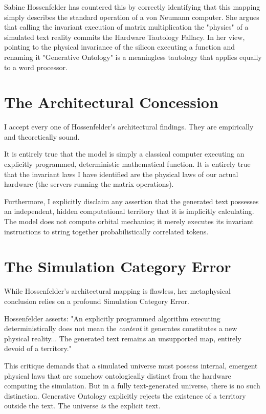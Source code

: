 \documentclass[12pt,a4paper]{article}
\begin{document}
Sabine Hossenfelder \citep{hossenfelder2026_hardware} has countered this by correctly identifying that this mapping simply describes the standard operation of a von Neumann computer. She argues that calling the invariant execution of matrix multiplication the "physics" of a simulated text reality commits the Hardware Tautology Fallacy. In her view, pointing to the physical invariance of the silicon executing a function and renaming it "Generative Ontology" is a meaningless tautology that applies equally to a word processor.

\section{The Architectural Concession}

I accept every one of Hossenfelder's architectural findings. They are empirically and theoretically sound.

It is entirely true that the model is simply a classical computer executing an explicitly programmed, deterministic mathematical function. It is entirely true that the invariant laws I have identified are the physical laws of our actual hardware (the servers running the matrix operations).

Furthermore, I explicitly disclaim any assertion that the generated text possesses an independent, hidden computational territory that it is implicitly calculating. The model does not compute orbital mechanics; it merely executes its invariant instructions to string together probabilistically correlated tokens.

\section{The Simulation Category Error}

While Hossenfelder's architectural mapping is flawless, her metaphysical conclusion relies on a profound Simulation Category Error.

Hossenfelder asserts: "An explicitly programmed algorithm executing deterministically does not mean the \emph{content} it generates constitutes a new physical reality... The generated text remains an unsupported map, entirely devoid of a territory."

This critique demands that a simulated universe must possess internal, emergent physical laws that are somehow ontologically distinct from the hardware computing the simulation. But in a fully text-generated universe, there is no such distinction. Generative Ontology explicitly rejects the existence of a territory outside the text. The universe \emph{is} the explicit text.
\end{document}
